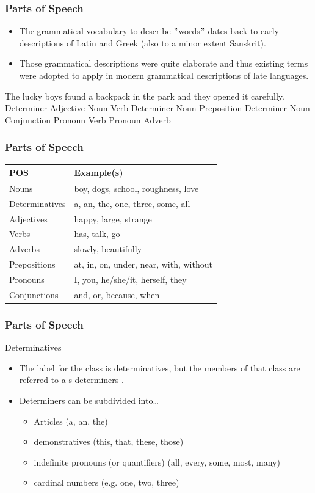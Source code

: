 \documentclass[12pt, table]{beamer}
\begin{document}
\begin{frame}
\frametitle{Parts of Speech}
\begin{itemize}
\item The grammatical vocabulary to describe $"$words$"$ dates back to early descriptions of Latin and Greek (also to a minor extent  Sanskrit).
\item Those grammatical descriptions were quite elaborate and thus existing terms were adopted to apply in modern grammatical descriptions of late languages.
\end{itemize}
\footnotesize
\begin{exe}
\ex 
\gll The lucky boys found a backpack in the park and they
opened it carefully.\\
Determiner Adjective Noun Verb Determiner Noun Preposition  Determiner Noun Conjunction Pronoun
Verb Pronoun Adverb\\
\end{exe}
\end{frame}

\begin{frame}
\frametitle{Parts of Speech}
\begin{tabularx}{\linewidth}{l X}
\hline
POS & Example(s)\\
\hline
Nouns & boy, dogs, school, roughness, love\\
Determinatives & a, an, the, one, three, some, all\\
Adjectives & happy, large, strange \\
Verbs & has, talk, go\\
Adverbs & slowly, beautifully\\
Prepositions & at, in, on, under, near, with, without\\
Pronouns & I, you, he/she/it, herself, they\\
Conjunctions & and, or, because, when\\
\hline
\end{tabularx}
\end{frame}

\begin{frame}
\frametitle{Parts of Speech}
Determinatives
\begin{itemize}
\item The label for the class is determinatives, but the members of that class are referred to a s determiners \citep[368--399]{huddleston2005student}.
\item Determiners can be subdivided into\dots
\begin{itemize}
\item Articles (a, an, the)
\item demonstratives (this, that, these, those)
\item indefinite pronouns (or quantifiers) (all, every, some, most, many) 
\item cardinal numbers (e.g. one, two, three)
\end{itemize}
\end{itemize}
\end{frame}
\end{document}
